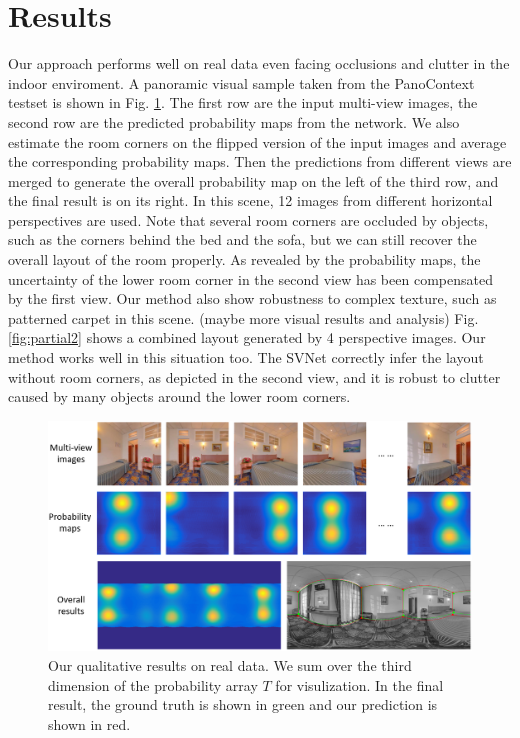 

\section{Results}
Our approach performs well on real data even facing occlusions and clutter in the indoor enviroment. A panoramic visual sample taken from the PanoContext testset is shown in Fig. \ref{fig:results2}.
%
The first row are the input multi-view images, the second row are the predicted probability maps from the network. We also estimate the room corners on the flipped version of the input images and average the corresponding probability maps. Then the predictions from different views are merged to generate the overall probability map on the left of the third row, and the final result is on its right. 
%
In this scene, 12 images from different horizontal perspectives are used. Note that several room corners are occluded by objects, such as the corners behind the bed and the sofa, but we can still recover the overall layout of the room properly. As revealed by the probability maps, the uncertainty of the lower room corner in the second view has been compensated by the first view. Our method also show robustness to complex texture, such as patterned carpet in this scene. (maybe more visual results and analysis)
%
Fig. \ref{fig:partial2} shows a combined layout generated by 4 perspective images. Our method works well in this situation too. The SVNet correctly infer the layout without room corners, as depicted in the second view, and it is robust to clutter caused by many objects around the lower room corners.


\begin{figure}[ht]
	\centering
	\includegraphics[width=\linewidth]{figs/results2.png}
	\caption{Our qualitative results on real data. We sum over the third dimension of the probability array $T$ for visulization. In the final result, the ground truth is shown in green and our prediction is shown in red. }
	\label{fig:results2}
\end{figure}

